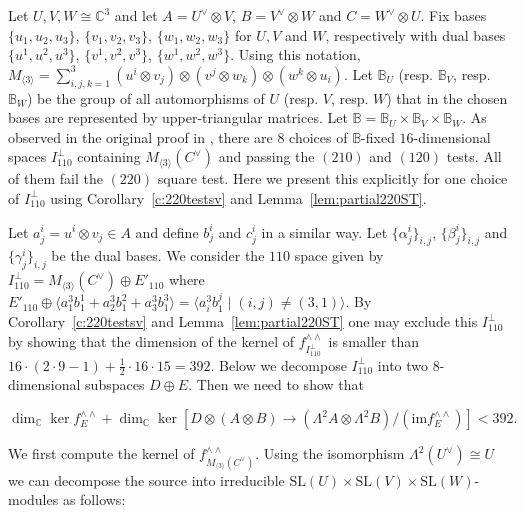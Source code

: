 \documentclass[12pt]{amsart}
\theoremstyle{definition}
\theoremstyle{remark}
\theoremstyle{definition}
\newcommand{\CC}{\mathbb{C}}
\begin{document}
Let $U,V,W\cong \mathbb{C}^3$ and let $A = U^\vee\otimes V$, $B=V^\vee\otimes W$ and $C=W^\vee\otimes U$. Fix bases $\{u_1,u_2,u_3\}$, $\{v_1, v_2, v_3\}$, $\{w_1,w_2,w_3\}$ for $U,V$ and $W$, respectively with dual bases $\{u^1, u^2, u^3\}$, $\{v^1, v^2, v^3\}$, $\{w^1, w^2, w^3\}$. Using this notation, $M_{\langle 3\rangle} = \sum_{i,j,k = 1}^3 (u^i\otimes v_j)\otimes (v^j\otimes w_k)\otimes (w^k\otimes u_i)$. Let  $\mathbb{B}_U$ (resp. $\mathbb{B}_V$, resp. $\mathbb{B}_W$) be the group of all automorphisms of $U$ (resp. $V$, resp. $W$) that in the chosen bases are represented by upper-triangular matrices. Let $\mathbb{B} = \mathbb{B}_U\times \mathbb{B}_V\times \mathbb{B}_W$. As observed in the original proof in \cite{chl19}, there are $8$ choices of $\mathbb{B}$-fixed $16$-dimensional spaces $I_{110}^\perp$ containing $M_{\langle 3\rangle}(C^\vee)$ and passing the $(210)$ and $(120)$ tests. All of them fail the $(220)$ square test. Here we present this explicitly for one choice of $I_{110}^\perp$ using Corollary~\ref{c:220testsv} and Lemma~\ref{lem:partial220ST}.

Let $a^i_j = u^i\otimes v_j \in A$ and define $b^{i}_j$ and $c^{i}_j$ in a similar way. 
Let $\{\alpha^{i}_j\}_{i,j}$, $\{\beta^i_j\}_{i,j}$ and $\{\gamma^{i}_j\}_{i,j}$ be the dual bases. 
We consider the $110$ space given by $I_{110}^\perp = M_{\langle 3 \rangle}(C^\vee) \oplus E'_{110}$ where $E'_{110} \oplus \langle a^3_1b^1_1 + a^3_2b^2_1 + a^3_3b^3_1\rangle = \langle a^3_ib^j_1 \mid (i,j) \ne (3,1) \rangle$. By Corollary~\ref{c:220testsv} and Lemma~\ref{lem:partial220ST} one may exclude this $I_{110}^\perp$ by showing that the dimension of the kernel of $f^{\wedge \wedge}_{I_{110}^\perp}$ is smaller than $16\cdot (2\cdot 9-1) + \frac{1}{2}\cdot 16\cdot 15 = 392$.
Below we decompose $I_{110}^\perp$ into two $8$-dimensional subspaces $D\oplus E$. Then we need to show that

\begin{equation}\label{eq:goal}
    \dim_\CC \ker f^{\wedge\wedge}_{E} + \dim_\CC \ker [D\otimes (A\otimes B) \to (\Lambda^2 A\otimes \Lambda^2B) / (\mathrm{im} f^{\wedge \wedge}_E)] < 392.
\end{equation}

We first compute the kernel of $f^{\wedge \wedge}_{M_{\langle 3\rangle}(C^\vee)}$.
Using the isomorphism $\Lambda^2(U^\vee) \cong U$ we can decompose the source into irreducible $\mathrm{SL}(U)\times \mathrm{SL}(V)\times \mathrm{SL}(W)$-modules as follows:
\end{document}
